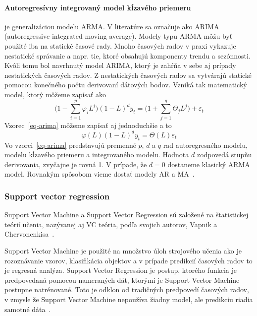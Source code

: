 \documentclass[a4paper,slovak,12pt,appendix]{article}
\begin{document}
\paragraph{Autoregresívny integrovaný model kĺzavého priemeru} je
generalizáciou modelu ARMA. V literatúre sa označuje ako ARIMA (autoregressive
integrated moving average). Modely typu ARMA môžu byť použité iba na statické
časové rady. Mnoho časových radov v praxi vykazuje nestatické správanie a napr.
tie, ktoré obsahujú komponenty trendu a sezónnosti. Kvôli tomu bol navrhnutý
model ARIMA, ktorý je zahŕňa v sebe aj prípady nestatických časových radov.
Z nestatických časových radov sa vytvárajú statické pomocou konečného počtu
derivovaní dátových bodov. Vzniká tak matematický model, ktorý môžeme zapísať
ako
\begin{equation}
  \Big( 1 - \sum_{i=1}^{p} \varphi_i L^i \Big) (1-L)^d y_t = \Big( 1 + \sum_{j=1}^{q} \Theta_j L^j \Big) + \varepsilon_t
  \label{eq-arima}
\end{equation}
Vzorec~\ref{eq-arima} môžeme zapísať aj jednoduchšie a to
\begin{equation}
  \varphi(L) (1-L)^d y_t = \Theta(L) \varepsilon_t
  \label{eq-arima-short}
\end{equation}
Vo vzorci~\ref{eq-arima} predstavujú premenné $p$, $d$ a $q$ rad autoregresného
modelu, modelu kĺzavého priemeru a integrovaného modelu. Hodnota $d$ zodpovedá
stupňu derivovania, zvyčajne je rovná 1. V prípade, že $d=0$ dostaneme klasický
ARMA model. Rovnakým spôsobom vieme dostať modely AR a MA~\cite{Agrawal2013}.


\subsubsection{Support vector regression}
Support Vector Machine a Support Vector Regression sú založené na štatistickej
teórií učenia, nazývanej aj VC teória, podľa svojich autorov, Vapnik
a Chervonenkisa~\cite{Sapankevych2009}.

Support Vector Machine je použité na množstvo úloh strojového učenia ako je
rozoznávanie vzorov, klasifikácia objektov a v prípade predikcií časových
radov to je regresná analýza. Support Vector Regression je postup, ktorého
funkcia je predpovedaná pomocou nameraných dát, ktorými je Support Vector
Machine postupne natrénované. Toto je odklon od tradičných predpovedí časových
radov, v zmysle že Support Vector Machine nepoužíva žiadny model, ale
predikciu riadia samotné dáta~\cite{Sapankevych2009}.
\end{document}
